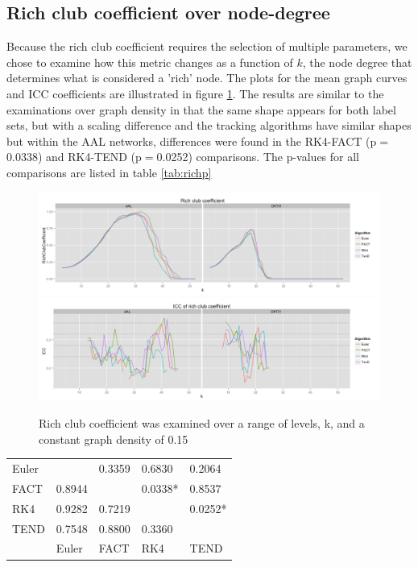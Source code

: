 \documentclass{frontiersSCNS} %
\begin{document}
\subsection{Rich club coefficient over node-degree}
Because the rich club coefficient requires the selection of multiple parameters, we chose to examine how this metric
changes as a function of $k$, the node degree that determines what is considered a 'rich' node. The plots for the
mean graph curves and ICC coefficients are illustrated in figure \ref{fig:richclub}. The results are similar to the examinations
over graph density in that the same shape appears for both label sets, but with a scaling difference and the tracking algorithms
have similar shapes but within the AAL networks, differences were found in the RK4-FACT (p$=$0.0338) and RK4-TEND (p$=$0.0252) 
comparisons. The p-values for all comparisons are listed in table \ref{tab:richp}

\begin{figure}
\begin{center}
\includegraphics[width=0.5\linewidth]{figures/richclub_plot.png} \\
\includegraphics[width=0.5\linewidth]{figures/richclub_icc_plot.png}
\caption{Rich club coefficient was examined over a range of levels, k, and a constant graph density of 0.15}
\label{fig:richclub}
\end{center}
\end{figure}

\begin{table}[!t]
{
\begin{tabular}{l | llll }
\midrule
Euler  &            & 0.3359  & 0.6830    & 0.2064   \\
FACT & 0.8944 &              & 0.0338*  & 0.8537     \\
RK4   & 0.9282 & 0.7219   &               & 0.0252*   \\
TEND & 0.7548 & 0.8800  & 0.3360    &                \\             
\midrule
         & Euler    & FACT     & RK4        & TEND        \\
\midrule
\end{tabular}}{}
\end{table}
\end{document}
